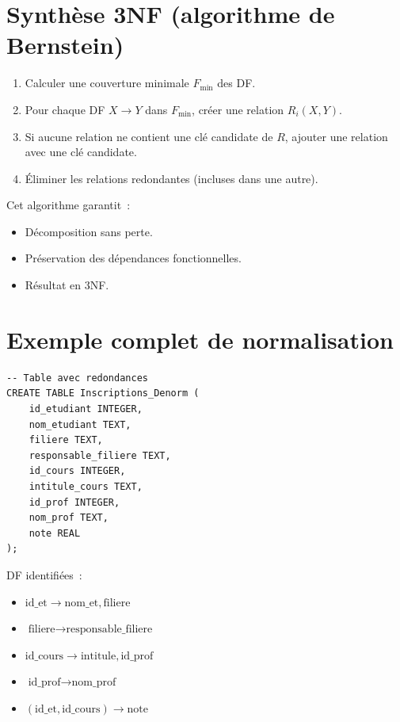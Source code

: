 \section{Synth\`ese 3NF (algorithme de Bernstein)}

\begin{proposition}
\begin{enumerate}
    \item Calculer une couverture minimale $F_{\min}$ des DF.
    \item Pour chaque DF $X \to Y$ dans $F_{\min}$, cr\'eer une relation $R_i(X, Y)$.
    \item Si aucune relation ne contient une cl\'e candidate de $R$, ajouter
          une relation avec une cl\'e candidate.
    \item \'Eliminer les relations redondantes (incluses dans une autre).
\end{enumerate}
Cet algorithme garantit~:
\begin{itemize}
    \item D\'ecomposition sans perte.
    \item Pr\'eservation des d\'ependances fonctionnelles.
    \item R\'esultat en 3NF.
\end{itemize}
\end{proposition}

\section{Exemple complet de normalisation}

\begin{codeblock}[title=\textbf{Table non normalis\'ee}]
\begin{verbatim}
-- Table avec redondances
CREATE TABLE Inscriptions_Denorm (
    id_etudiant INTEGER,
    nom_etudiant TEXT,
    filiere TEXT,
    responsable_filiere TEXT,
    id_cours INTEGER,
    intitule_cours TEXT,
    id_prof INTEGER,
    nom_prof TEXT,
    note REAL
);
\end{verbatim}
\end{codeblock}

DF identifi\'ees~:
\begin{itemize}
    \item $\text{id\_et} \to \text{nom\_et}, \text{filiere}$
    \item $\text{filiere} \to \text{responsable\_filiere}$
    \item $\text{id\_cours} \to \text{intitule}, \text{id\_prof}$
    \item $\text{id\_prof} \to \text{nom\_prof}$
    \item $(\text{id\_et}, \text{id\_cours}) \to \text{note}$
\end{itemize}

